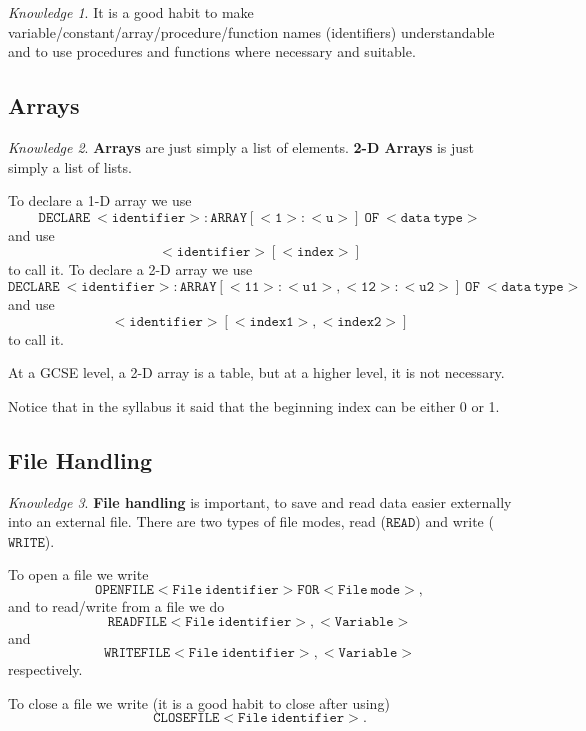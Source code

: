 \documentclass[8pt]{article}
\theoremstyle{remark}
\newtheorem{knowledge}{Knowledge}[subsection]
\begin{document}
            \begin{knowledge}
                It is a good habit to make variable/constant/array/procedure/function names (identifiers) understandable and to use procedures and functions where necessary and suitable.
            \end{knowledge}
        \subsection{Arrays}
            
            \begin{knowledge}
                \textbf{Arrays} are just simply a list of elements. \textbf{2-D Arrays} is just simply a list of lists.

                To declare a 1-D array we use
                \[
                    \mathtt{DECLARE\ <identifier>:ARRAY[<1>:<u>]\ OF\ <data\ type>}
                \]
                and use
                \[
                    \mathtt{<identifier>[<index>]}
                \]
                to call it. To declare a 2-D array we use
                \[
                    \mathtt{DECLARE\ <identifier>:ARRAY[<11>:<u1>, <12>:<u2>]\ OF\ <data\ type>}
                \]
                and use
                \[
                    \mathtt{<identifier>[<index1>, <index2>]}
                \]
                to call it.

                At a GCSE level, a 2-D array is a table, but at a higher level, it is not necessary.

                Notice that in the syllabus it said that the beginning index can be either 0 or 1.
            \end{knowledge}

        \subsection{File Handling}
            
            \begin{knowledge}
                \textbf{File handling} is important, to save and read data easier externally into an external file. There are two types of file modes, read (\(\mathtt{READ}\)) and write (\(\mathtt{WRITE}\)).

                To open a file we write
                \[
                    \mathtt{OPENFILE <File\ identifier> FOR <File\ mode>},
                \]
                and to read/write from a file we do
                \[
                    \mathtt{READFILE <File\ identifier>, <Variable>}
                \]
                and
                \[
                    \mathtt{WRITEFILE <File\ identifier>, <Variable>}
                \]
                respectively.

                To close a file we write (it is a good habit to close after using)
                \[
                    \mathtt{CLOSEFILE <File\ identifier>}.
                \]
            \end{knowledge}
\end{document}

